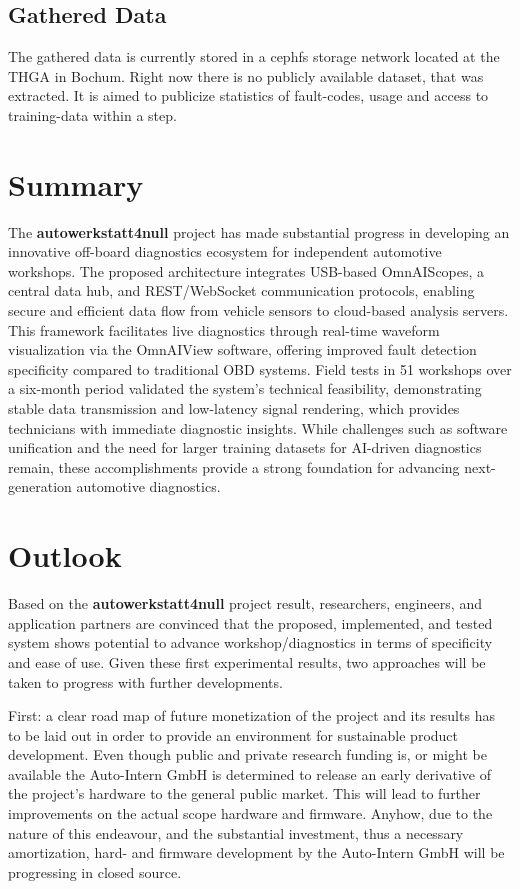 \subsection{Gathered Data}
The gathered data is currently stored in a cephfs storage network located at the THGA in Bochum.
Right now there is no publicly available dataset, that was extracted.
It is aimed to publicize statistics of fault-codes, usage and access to training-data within a step. 

\section{Summary}
The \textbf{autowerkstatt4null} project has made substantial progress in developing an innovative off-board diagnostics ecosystem for independent automotive workshops. 
The proposed architecture integrates USB-based OmnAIScopes, a central data hub, and REST/WebSocket communication protocols, 
enabling secure and efficient data flow from vehicle sensors to cloud-based analysis servers. 
This framework facilitates live diagnostics through real-time waveform visualization via the OmnAIView software, 
offering improved fault detection specificity compared to traditional OBD systems. 
Field tests in 51 workshops over a six-month period validated the system's technical feasibility, 
demonstrating stable data transmission and low-latency signal rendering, which provides technicians with immediate diagnostic insights. 
While challenges such as software unification and the need for larger training datasets for AI-driven diagnostics remain, 
these accomplishments provide a strong foundation for advancing next-generation automotive diagnostics.

\section{Outlook}
Based on the \textbf{autowerkstatt4null} project result, researchers, engineers, and application partners are convinced that the proposed, 
implemented, and tested system shows potential to advance workshop/diagnostics in terms of specificity and ease of use.
Given these first experimental results, two approaches will be taken to progress with further developments. 

First: a clear road map of future monetization of the project and its results has to be laid out in order to provide an environment for sustainable product development. 
Even though public and private research funding is, or might be available the Auto-Intern GmbH is determined to release an early derivative of the project's hardware to the general public market. 
This will lead to further improvements on the actual scope hardware and firmware. 
Anyhow, due to the nature of this endeavour, and the substantial investment, thus a necessary amortization, hard- and firmware development by the Auto-Intern GmbH will be progressing in closed source. 


